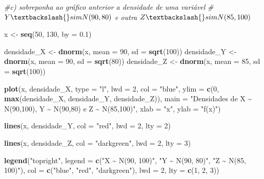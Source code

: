 \documentclass[
]{article}
\newenvironment{Shaded}{\begin{snugshade}}{\end{snugshade}}
\newcommand{\AttributeTok}[1]{\textcolor[rgb]{0.13,0.29,0.53}{#1}}
\newcommand{\CommentTok}[1]{\textcolor[rgb]{0.56,0.35,0.01}{\textit{#1}}}
\newcommand{\DecValTok}[1]{\textcolor[rgb]{0.00,0.00,0.81}{#1}}
\newcommand{\FloatTok}[1]{\textcolor[rgb]{0.00,0.00,0.81}{#1}}
\newcommand{\FunctionTok}[1]{\textcolor[rgb]{0.13,0.29,0.53}{\textbf{#1}}}
\newcommand{\NormalTok}[1]{#1}
\newcommand{\OtherTok}[1]{\textcolor[rgb]{0.56,0.35,0.01}{#1}}
\newcommand{\StringTok}[1]{\textcolor[rgb]{0.31,0.60,0.02}{#1}}
\begin{document}
\begin{Shaded}
\begin{Highlighting}[]
\CommentTok{\#c) sobreponha ao gráfico anterior a densidade de uma variável }
\CommentTok{\#$Y \textbackslash{}sim N(90, 80)$ e outra $Z \textbackslash{}sim N(85, 100)$}


\NormalTok{x }\OtherTok{\textless{}{-}} \FunctionTok{seq}\NormalTok{(}\DecValTok{50}\NormalTok{, }\DecValTok{130}\NormalTok{, }\AttributeTok{by =} \FloatTok{0.1}\NormalTok{)}


\NormalTok{densidade\_X }\OtherTok{\textless{}{-}} \FunctionTok{dnorm}\NormalTok{(x, }\AttributeTok{mean =} \DecValTok{90}\NormalTok{, }\AttributeTok{sd =} \FunctionTok{sqrt}\NormalTok{(}\DecValTok{100}\NormalTok{))     }
\NormalTok{densidade\_Y }\OtherTok{\textless{}{-}} \FunctionTok{dnorm}\NormalTok{(x, }\AttributeTok{mean =} \DecValTok{90}\NormalTok{, }\AttributeTok{sd =} \FunctionTok{sqrt}\NormalTok{(}\DecValTok{80}\NormalTok{))      }
\NormalTok{densidade\_Z }\OtherTok{\textless{}{-}} \FunctionTok{dnorm}\NormalTok{(x, }\AttributeTok{mean =} \DecValTok{85}\NormalTok{, }\AttributeTok{sd =} \FunctionTok{sqrt}\NormalTok{(}\DecValTok{100}\NormalTok{))     }

\FunctionTok{plot}\NormalTok{(x, densidade\_X, }\AttributeTok{type =} \StringTok{"l"}\NormalTok{, }\AttributeTok{lwd =} \DecValTok{2}\NormalTok{, }\AttributeTok{col =} \StringTok{"blue"}\NormalTok{,}
     \AttributeTok{ylim =} \FunctionTok{c}\NormalTok{(}\DecValTok{0}\NormalTok{, }\FunctionTok{max}\NormalTok{(densidade\_X, densidade\_Y, densidade\_Z)),}
     \AttributeTok{main =} \StringTok{"Densidades de X \textasciitilde{} N(90,100), Y \textasciitilde{} N(90,80) e Z \textasciitilde{} N(85,100)"}\NormalTok{,}
     \AttributeTok{xlab =} \StringTok{"x"}\NormalTok{, }\AttributeTok{ylab =} \StringTok{"f(x)"}\NormalTok{)}


\FunctionTok{lines}\NormalTok{(x, densidade\_Y, }\AttributeTok{col =} \StringTok{"red"}\NormalTok{, }\AttributeTok{lwd =} \DecValTok{2}\NormalTok{, }\AttributeTok{lty =} \DecValTok{2}\NormalTok{)}

\FunctionTok{lines}\NormalTok{(x, densidade\_Z, }\AttributeTok{col =} \StringTok{"darkgreen"}\NormalTok{, }\AttributeTok{lwd =} \DecValTok{2}\NormalTok{, }\AttributeTok{lty =} \DecValTok{3}\NormalTok{)}

\FunctionTok{legend}\NormalTok{(}\StringTok{"topright"}\NormalTok{, }\AttributeTok{legend =} \FunctionTok{c}\NormalTok{(}\StringTok{"X \textasciitilde{} N(90, 100)"}\NormalTok{, }\StringTok{"Y \textasciitilde{} N(90, 80)"}\NormalTok{, }\StringTok{"Z \textasciitilde{} N(85, 100)"}\NormalTok{),}
       \AttributeTok{col =} \FunctionTok{c}\NormalTok{(}\StringTok{"blue"}\NormalTok{, }\StringTok{"red"}\NormalTok{, }\StringTok{"darkgreen"}\NormalTok{), }\AttributeTok{lwd =} \DecValTok{2}\NormalTok{, }\AttributeTok{lty =} \FunctionTok{c}\NormalTok{(}\DecValTok{1}\NormalTok{, }\DecValTok{2}\NormalTok{, }\DecValTok{3}\NormalTok{))}
\end{Highlighting}
\end{Shaded}
\end{document}
